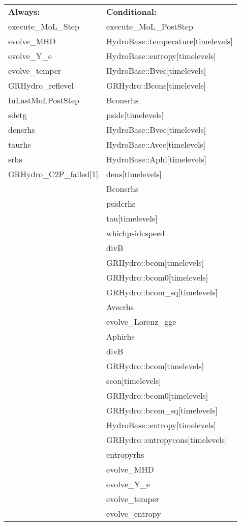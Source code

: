 \documentclass{article}
\begin{document}
 \begin{tabular*}{160mm}{ll} 

{\bf Always:}& {\bf Conditional:} \\ 
 execute\_MoL\_Step &  execute\_MoL\_PostStep\\ 
 evolve\_MHD &  HydroBase::temperature[timelevels]\\ 
 evolve\_Y\_e &  HydroBase::entropy[timelevels]\\ 
 evolve\_temper &  HydroBase::Bvec[timelevels]\\ 
 GRHydro\_reflevel &  GRHydro::Bcons[timelevels]\\ 
 InLastMoLPostStep &  Bconsrhs\\ 
 sdetg &  psidc[timelevels]\\ 
 densrhs &  HydroBase::Bvec[timelevels]\\ 
 taurhs &  HydroBase::Avec[timelevels]\\ 
 srhs &  HydroBase::Aphi[timelevels]\\ 
 GRHydro\_C2P\_failed[1] &  dens[timelevels]\\ 
~ &  Bconsrhs\\ 
~ &  psidcrhs\\ 
~ &  tau[timelevels]\\ 
~ &  whichpsidcspeed\\ 
~ &  divB\\ 
~ &  GRHydro::bcom[timelevels]\\ 
~ &  GRHydro::bcom0[timelevels]\\ 
~ &  GRHydro::bcom\_sq[timelevels]\\ 
~ &  Avecrhs\\ 
~ &  evolve\_Lorenz\_gge\\ 
~ &  Aphirhs\\ 
~ &  divB\\ 
~ &  GRHydro::bcom[timelevels]\\ 
~ &  scon[timelevels]\\ 
~ &  GRHydro::bcom0[timelevels]\\ 
~ &  GRHydro::bcom\_sq[timelevels]\\ 
~ &  HydroBase::entropy[timelevels]\\ 
~ &  GRHydro::entropycons[timelevels]\\ 
~ &  entropyrhs\\ 
~ &  evolve\_MHD\\ 
~ &  evolve\_Y\_e\\ 
~ &  evolve\_temper\\ 
~ &  evolve\_entropy\\ 

\end{tabular*}
\end{document}

